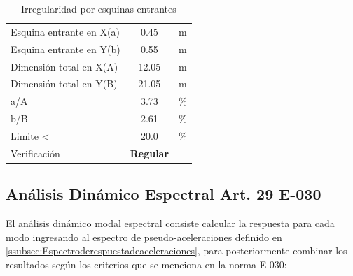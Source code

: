 \documentclass{article}%
\begin{document}
%


\begin{table}[H]%
\centering%
\caption{Irregularidad por esquinas entrantes}%
\begin{tabular}{llcr}%
\cline{1-3}%
\multicolumn{2}{l}{Esquina entrante en X(a)} & 0.45 & \multicolumn{1}{l}{m} \\%
\multicolumn{2}{l}{Esquina entrante en Y(b)} & 0.55 & \multicolumn{1}{l}{m} \\%
\multicolumn{2}{l}{Dimensión total en X(A)} & 12.05 & \multicolumn{1}{l}{m} \\%
\multicolumn{2}{l}{Dimensión total en Y(B)} & 21.05 & \multicolumn{1}{l}{m} \\%
\multicolumn{2}{l}{a/A} & 3.73 & \multicolumn{1}{l}{\%} \\%
\multicolumn{2}{l}{b/B} & 2.61 & \multicolumn{1}{l}{\%} \\%
\multicolumn{2}{l}{Limite <} & 20.0 & \multicolumn{1}{l}{\%} \\%
\multicolumn{2}{l}{Verificación} & \textcolor[rgb]{ .267,  .447,  .769}{\textbf{Regular}} & \multicolumn{1}{l}{} \\%
\cline{1-3}%
\end{tabular}%
\end{table}

%
\subsection{Análisis Dinámico Espectral Art. 29 E{-}030}%
\label{subsec:AnlisisDinmicoEspectralArt.29E{-}030}%
El análisis dinámico modal espectral consiste calcular la respuesta para cada modo ingresando al espectro de pseudo-aceleraciones definido en \ref{ssubsec:Espectroderespuestadeaceleraciones}, para posteriormente combinar los resultados según los criterios que se menciona en la norma E-030:%

%
\end{document}
